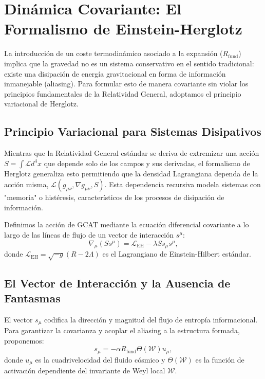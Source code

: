 \documentclass[12pt, a4paper]{article}
\theoremstyle{plain}
\theoremstyle{definition}
\begin{document}
\section{Dinámica Covariante: El Formalismo de Einstein-Herglotz}
\label{sec:dinamica}

La introducción de un coste termodinámico asociado a la expansión ($R_{\text{fund}}$) implica que la gravedad no es un sistema conservativo en el sentido tradicional: existe una disipación de energía gravitacional en forma de información inmanejable (aliasing). Para formular esto de manera covariante sin violar los principios fundamentales de la Relatividad General, adoptamos el principio variacional de Herglotz.

\subsection{Principio Variacional para Sistemas Disipativos}

Mientras que la Relatividad General estándar se deriva de extremizar una acción $S = \int \mathcal{L} d^4x$ que depende solo de los campos y sus derivadas, el formalismo de Herglotz generaliza esto permitiendo que la densidad Lagrangiana dependa de la acción misma, $\mathcal{L}(g_{\mu\nu}, \nabla g_{\mu\nu}, S)$. Esta dependencia recursiva modela sistemas con "memoria" o histéresis, característicos de los procesos de disipación de información.

Definimos la acción de GCAT mediante la ecuación diferencial covariante a lo largo de las líneas de flujo de un vector de interacción $s^\mu$:
\begin{equation}
\nabla_\mu (S s^\mu) = \mathcal{L}_{\text{EH}} - \lambda S s_\mu s^\mu,
\end{equation}
donde $\mathcal{L}_{\text{EH}} = \sqrt{-g}(R - 2\Lambda)$ es el Lagrangiano de Einstein-Hilbert estándar.

\subsection{El Vector de Interacción y la Ausencia de Fantasmas}

El vector $s_\mu$ codifica la dirección y magnitud del flujo de entropía informacional. Para garantizar la covarianza y acoplar el aliasing a la estructura formada, proponemos:
\begin{equation}
s_\mu = -\alpha R_{\text{fund}} \Theta(\mathcal{W}) u_\mu,
\end{equation}
donde $u_\mu$ es la cuadrivelocidad del fluido cósmico y $\Theta(\mathcal{W})$ es la función de activación dependiente del invariante de Weyl local $\mathcal{W}$.
\end{document}
